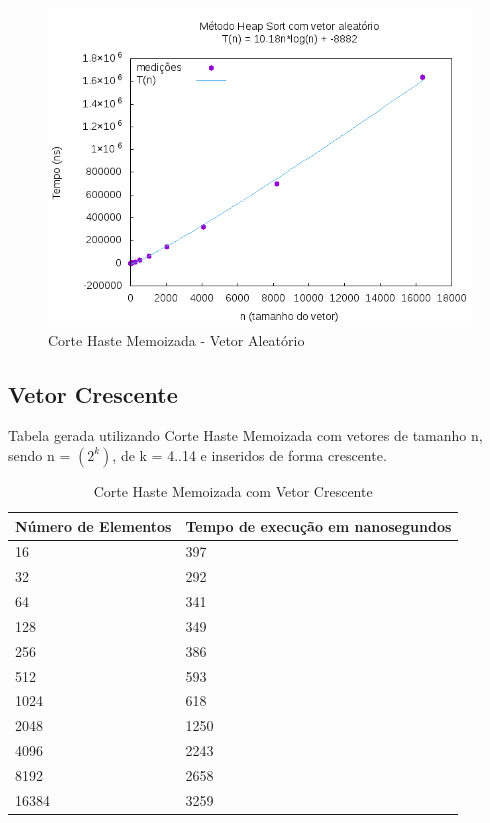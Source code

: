 \documentclass[12pt,a4paper,twoside]{report}
\begin{document}
\begin{figure}[H]
    \centering
    \includegraphics[width=0.7\linewidth]{graficos/HeapSort/vIntAleatorio/vIntAleatorio.png}
  \caption{Corte Haste Memoizada - Vetor Aleatório}
\end{figure}



\subsection{Vetor Crescente}
Tabela gerada utilizando Corte Haste Memoizada com vetores de tamanho n, sendo n = $(2^k)$, de k = 4..14 e inseridos de forma crescente.
\begin{table}[H]
\centering
\caption{Corte Haste Memoizada com Vetor Crescente}
\label{my-label}
\begin{tabular}{|l|l|}
\hline
\multicolumn{1}{|c|}{\textbf{Número de Elementos}} & \multicolumn{1}{c|}{\textbf{Tempo de execução em nanosegundos}} \\ \hline
16 & 397 \\ \hline
32 & 292 \\ \hline
64 & 341 \\ \hline
128 & 349 \\ \hline
256 & 386 \\ \hline
512 & 593 \\ \hline
1024 & 618 \\ \hline
2048 & 1250 \\ \hline
4096 & 2243 \\ \hline
8192 & 2658 \\ \hline
16384 & 3259 \\ \hline
\end{tabular}
\end{table}
\end{document}
